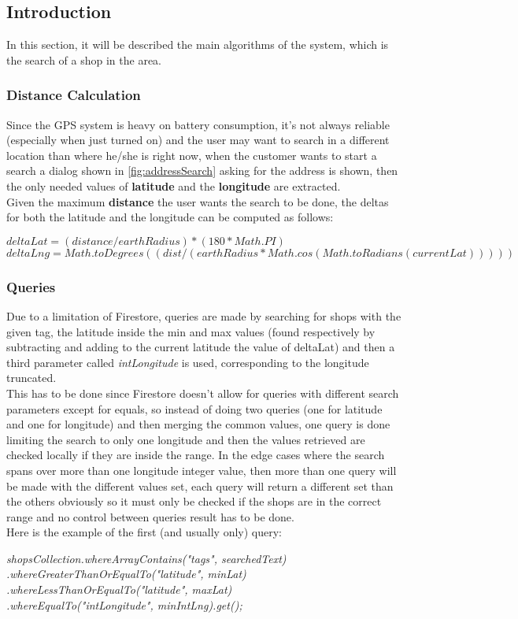 \subsection{Introduction}
In this section, it will be described the main algorithms of the system, which is the search of a shop in the area.

\subsubsection{Distance Calculation}
Since the GPS system is heavy on battery consumption, it's not always reliable (especially when just turned on) and the user may want to search in a different location than where he/she is right now, when the customer wants to start a search a dialog shown in \autoref{fig:addressSearch} asking for the address is shown, then the only needed values of \textbf{latitude} and the \textbf{longitude} are extracted.\\
Given the maximum \textbf{distance} the user wants the search to be done, the deltas for both the latitude and the longitude can be computed as follows:\\
\begin{center}
$ deltaLat = (distance/earthRadius) * (180 * Math.PI) $\\
$ deltaLng = Math.toDegrees((dist / (earthRadius * Math.cos(Math.toRadians(currentLat))))) $
\end{center}

\subsubsection{Queries}
Due to a limitation of Firestore, queries are made by searching for shops with the given tag, the latitude inside the min and max values (found respectively by subtracting and adding to the current latitude the value of deltaLat) and then a third parameter called \textit{intLongitude} is used, corresponding to the longitude truncated.\\
This has to be done since Firestore doesn't allow for queries with different search parameters except for equals, so instead of doing two queries (one for latitude and one for longitude) and then merging the common values, one query is done limiting the search to only one longitude and then the values retrieved are checked locally if they are inside the range. In the edge cases where the search spans over more than one longitude integer value, then more than one query will be made with the different values set, each query will return a different set than the others obviously so it must only be checked if the shops are in the correct range and no control between queries result has to be done.\\
Here is the example of the first (and usually only) query:\\
\begin{center}
\textit{shopsCollection.whereArrayContains("tags", searchedText)\\
.whereGreaterThanOrEqualTo("latitude", minLat)\\
.whereLessThanOrEqualTo("latitude", maxLat)\\
.whereEqualTo("intLongitude", minIntLng).get();}
\end{center}